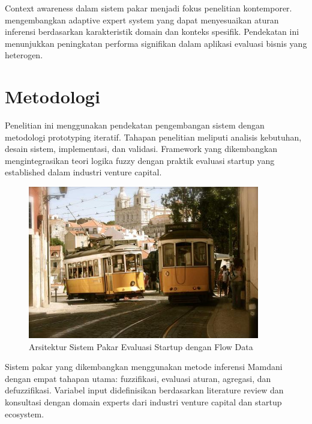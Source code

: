 \documentclass[12pt,a4paper]{article}
\begin{document}
Context awareness dalam sistem pakar menjadi fokus penelitian kontemporer. \citet{Chen2023} mengembangkan adaptive expert system yang dapat menyesuaikan aturan inferensi berdasarkan karakteristik domain dan konteks spesifik. Pendekatan ini menunjukkan peningkatan performa signifikan dalam aplikasi evaluasi bisnis yang heterogen.

\section{Metodologi}

Penelitian ini menggunakan pendekatan pengembangan sistem dengan metodologi prototyping iteratif. Tahapan penelitian meliputi analisis kebutuhan, desain sistem, implementasi, dan validasi. Framework yang dikembangkan mengintegrasikan teori logika fuzzy dengan praktik evaluasi startup yang established dalam industri venture capital.

\begin{figure}[H]
    \centering
    \includegraphics[width=0.9\textwidth]{assets/image.png}
    \caption{Arsitektur Sistem Pakar Evaluasi Startup dengan Flow Data}
    \label{fig:architecture}
\end{figure}

Sistem pakar yang dikembangkan menggunakan metode inferensi Mamdani dengan empat tahapan utama: fuzzifikasi, evaluasi aturan, agregasi, dan defuzzifikasi. Variabel input didefinisikan berdasarkan literature review dan konsultasi dengan domain experts dari industri venture capital dan startup ecosystem.
\end{document}
